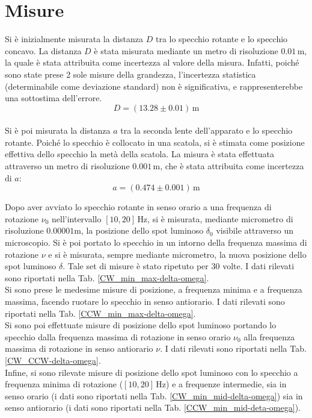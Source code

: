 \documentclass[]{article}
\let\oldsection\section%
\renewcommand{\section}{%
	\renewcommand{\theequation}{\thesection.\arabic{equation}}%
	\oldsection}%
\begin{document}
    
    

    \section{Misure}
    
    Si è inizialmente misurata la distanza $D$ tra lo specchio rotante e lo specchio concavo. La distanza $D$ è stata misurata mediante un metro di risoluzione $ 0.01 \, \text{m} $, la quale è stata attribuita come incertezza al valore della misura. Infatti, poiché sono state prese 2 sole misure della grandezza, l'incertezza statistica (determinabile come deviazione standard) non è significativa, e rappresenterebbe una sottostima dell'errore.
    \begin{equation}
        \label{equation-for-D}
        D = (13.28 \pm 0.01) \, \text{m}
    \end{equation} \\
    Si è poi misurata la distanza $a$ tra la seconda lente dell'apparato e lo specchio rotante. Poiché lo specchio è collocato in una scatola, si è stimata come posizione effettiva dello specchio la metà della scatola. La misura è stata effettuata attraverso un metro di risoluzione $ 0.001 \, \text{m} $, che è stata attribuita come incertezza di $a$:
    \begin{equation}
        \label{equation for a}
        a = (0.474 \pm 0.001) \, \text{m}
    \end{equation}

    Dopo aver avviato lo specchio rotante in senso orario a una frequenza di rotazione $ \nu_0 $ nell'intervallo $[10,20] \, \text{Hz}$, si è misurata, mediante micrometro di risoluzione $ 0.00001 \text{m} $, la posizione dello spot luminoso $\delta_0$ visibile attraverso un microscopio. Si è poi portato lo specchio in un intorno della frequenza massima di rotazione $ \nu $ e si è misurata, sempre mediante micrometro, la nuova posizione dello spot luminoso $\delta$. Tale set di misure è stato ripetuto per $30$ volte. I dati rilevati sono riportati nella Tab. \ref{CW_min_max-delta-omega}. \\
    Si sono prese le medesime misure di posizione, a frequenza minima e a frequenza massima, facendo ruotare lo specchio in senso antiorario. I dati rilevati sono riportati nella Tab. \ref{CCW_min_max-delta-omega}. \\
    Si sono poi effettuate misure di posizione dello spot luminoso portando lo specchio dalla frequenza massima di rotazione in senso orario $\nu_0$ alla frequenza massima di rotazione in senso antiorario $\nu$. I dati rilevati sono riportati nella Tab. \ref{CW_CCW-delta-omega}. \\
    Infine, si sono rilevate misure di posizione dello spot luminoso con lo specchio a frequenza minima di rotazione ($[10,20] \, \text{Hz}$) e a frequenze intermedie, sia in senso orario (i dati sono riportati nella Tab. \ref{CW_min_mid-delta-omega}) sia in senso antiorario (i dati sono riportati nella Tab. \ref{CCW_min_mid-deta-omega}).
\end{document}
